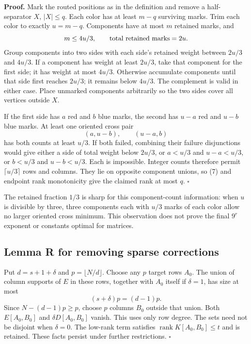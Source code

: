\documentclass[
  11pt,
]{article}
\begin{document}
\textbf{Proof.} Mark the routed positions as in the definition and
remove a half-separator \(X\), \(|X|\le q\). Each color has at least
\(m-q\) surviving marks. Trim each color to exactly \(u=m-q\).
Components have at most \(m\) retained marks, and \[
 m\le4u/3,\qquad\hbox{total retained marks}=2u.
\] Group components into two sides with each side's retained weight
between \(2u/3\) and \(4u/3\). If a component has weight at least
\(2u/3\), take that component for the first side; it has weight at most
\(4u/3\). Otherwise accumulate components until that side first reaches
\(2u/3\); it remains below \(4u/3\). The complement is valid in either
case. Place unmarked components arbitrarily so the two sides cover all
vertices outside \(X\).

If the first side has \(a\) red and \(b\) blue marks, the second has
\(u-a\) red and \(u-b\) blue marks. At least one oriented cross pair \[
 (a,u-b),\qquad (u-a,b)
\] has both counts at least \(u/3\). If both failed, combining their
failure disjunctions would give either a side of total weight below
\(2u/3\), or \(a<u/3\) and \(u-a<u/3\), or \(b<u/3\) and \(u-b<u/3\).
Each is impossible. Integer counts therefore permit \(\lceil u/3\rceil\)
rows and columns. They lie on opposite component unions, so (7) and
endpoint rank monotonicity give the claimed rank at most \(q\).
\(\square\)

The retained fraction \(1/3\) is sharp for this component-count
information: when \(u\) is divisible by three, three components each
with \(u/3\) marks of each color allow no larger oriented cross minimum.
This observation does not prove the final \(9^r\) exponent or constants
optimal for matrices.

\subsection{Lemma R for removing sparse
corrections}\label{lemma-r-for-removing-sparse-corrections}

Put \(d=s+1+\delta\) and \(p=\lfloor N/d\rfloor\). Choose any \(p\)
target rows \(A_0\). The union of column supports of \(E\) in these
rows, together with \(A_0\) itself if \(\delta=1\), has size at most \[
 (s+\delta)p=(d-1)p.
\] Since \(N-(d-1)p\ge p\), choose \(p\) columns \(B_0\) outside that
union. Both \(E[A_0,B_0]\) and \(\delta D[A_0,B_0]\) vanish. This uses
only row degree. The sets need not be disjoint when \(\delta=0\). The
low-rank term satisfies \(\operatorname{rank}K[A_0,B_0]\le t\) and is
retained. These facts persist under further restrictions. \(\square\)
\end{document}
